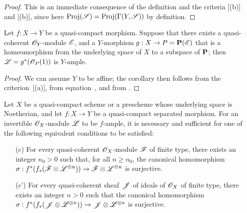 \begin{proof}
This is an immediate consequence of the definition  and the criteria [(b)] and [(b)], since here $\operatorname{Proj}(\mathscr{S})=\operatorname{Proj}(\Gamma(Y,\mathscr{S}))$ by definition.
\end{proof}

\begin{corollary}[4.6.7]
\label{II.4.6.7}
Let $f: X\to Y$ be a quasi-compact morphism.
Suppose that there exists a quasi-coherent $\mathscr{O}_Y$-module $\mathscr{E}$, and a $Y$-morphism $g:X\to P=\bb{P}(\sh{E})$ that is a homeomorphism from the underlying space of $X$ to a subspace of $\mathbf{P}$;
then $\mathscr{L}=g^*(\mathscr{O}_P(1))$ is $Y$-ample.
\end{corollary}

\begin{proof}
We can assume $Y$ to be affine;
the corollary then follows from the criterion~[(a)], from equation~, and from .
\end{proof}

\begin{proposition}[4.6.8]
\label{II.4.6.8}
Let $X$ be a quasi-compact scheme or a prescheme whose underlying space is Noetherian, and let $f:X\to Y$ be a quasi-compact separated morphism.
For an invertible $\mathscr{O}_X$-module $\mathscr{L}$ to be $f$-ample, it is necessary and sufficient for one of the following equivalent conditions to be satisfied:
\begin{enumerate}
  \item[\rm{(c)}] For every quasi-coherent $\mathscr{O}_X$-module $\mathscr{F}$ of finite type, there exists an integer $n_0>0$ such that, for all $n\geq n_0$, the canonical homomorphism $\sigma:f^*(f_*(\sh{F}\otimes\sh{L}^{\otimes n}))\to\sh{F}\otimes\sh{L}^{\otimes n}$ is surjective.
  \item[\rm{(c')}] For every quasi-coherent sheaf $\mathscr{J}$ of ideals of $\mathscr{O}_X$ of finite type, there exists an integer $n>0$ such that the canonical homomorphism $\sigma:f^*(f_*(\sh{J}\otimes\sh{L}^{\otimes n}))\to\sh{J}\otimes\sh{L}^{\otimes n}$ is surjective.
\end{enumerate}
\end{proposition}

